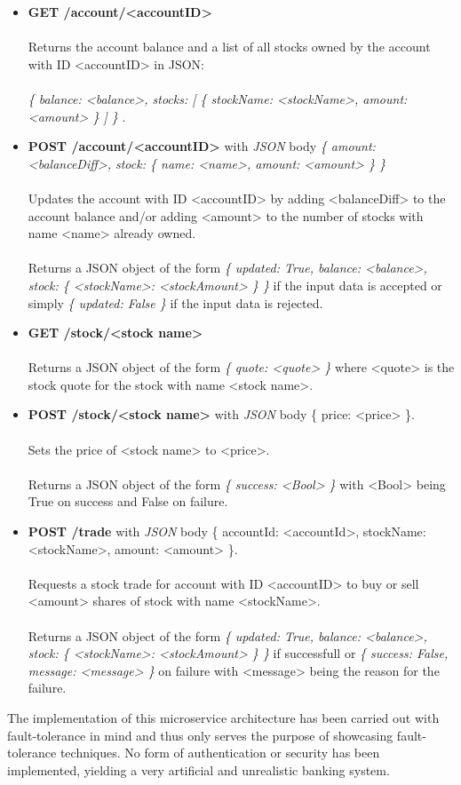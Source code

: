 \begin{itemize}
\item \textbf{GET /account/<accountID>}
  \\\\
  Returns the account balance and a list of all stocks owned by the
  account with ID <accountID> in JSON:
  \\\\
    \textit{
    \{
    balance: <balance>,
    stocks:
    [
      \{
      stockName: <stockName>,
      amount: <amount>
      \}
    ]
    \}
  }.
\item \textbf{POST /account/<accountID>} with \emph{JSON} body
  \textit{
    \{
      amount: <balanceDiff>,
      stock:
        \{
          name: <name>,
          amount: <amount>
        \}
    \}
  }
  \\\\
  Updates the account with ID <accountID> by adding <balanceDiff> to
  the account balance and/or adding <amount> to the number of stocks with
  name <name> already owned.
  \\\\
  Returns a JSON object of the form
  \textit {
    \{
      updated: True,
      balance: <balance>,
      stock:
        \{
          <stockName>: <stockAmount>
        \}
    \}
  }
  if the input data is accepted or simply
  \textit{
    \{ updated: False \}
  }
  if the input data is rejected.
\item \textbf{GET /stock/<stock name>}
  \\\\
  Returns a JSON object of the form \textit{
    \{ quote: <quote> \}
  } where <quote> is the stock quote for the stock with name <stock name>.
\item \textbf{POST /stock/<stock name>} with \emph{JSON} body \{ price:
  <price> \}.
  \\\\
  Sets the price of <stock name> to <price>.
  \\\\
  Returns a JSON object of the form \textit{
    \{ success: <Bool> \}
  } with <Bool> being True on success and False on failure.
\item \textbf{POST /trade} with \emph{JSON} body \{ accountId: <accountId>, stockName:
  <stockName>, amount: <amount> \}.
  \\\\
  Requests a stock trade for account with ID <accountID> to buy or
  sell <amount> shares of stock with name <stockName>.
  \\\\
  Returns a JSON object of the form
  \textit {
    \{
      updated: True,
      balance: <balance>,
      stock:
        \{
          <stockName>: <stockAmount>
        \}
    \}
  }
  if successfull or
    \textit {
    \{
      success: False,
      message: <message>
    \}
  }
  on failure with <message> being the reason for the failure.

\end{itemize}

The implementation of this microservice architecture has been carried
out with fault-tolerance in mind and thus only serves the purpose of
showcasing fault-tolerance techniques. No form of authentication or
security has been implemented, yielding a very artificial and
unrealistic banking system.
